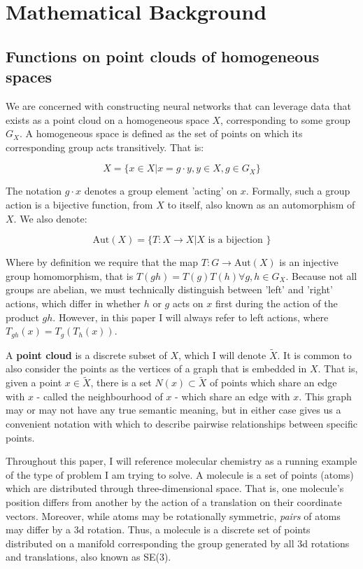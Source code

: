 \documentclass[11pt]{article}
\begin{document}
\section{Mathematical Background}
\subsection*{Functions on point clouds of homogeneous spaces}

We are concerned with constructing neural networks that can leverage data that exists as a point cloud on a homogeneous space $X$, corresponding to some group $G_X$. A homogeneous space is defined as the set of points on which its corresponding group acts transitively. That is: 

$$ X = \{x \in X | x = g \cdot y, y \in X, g \in G_X \} $$

The notation $g \cdot x$ denotes a group element 'acting' on $x$. Formally, such a group action is a bijective function, from $X$ to itself, also known as an automorphism of $X$. We also denote:

$$ \text{Aut}(X) = \{T: X \rightarrow X | X \text{ is a bijection } \}$$

Where by definition we require that the map $T: G \rightarrow \text{Aut}(X)$ is an injective group homomorphism, that is $T(gh)=T(g)T(h) \forall g, h \in G_X$. Because not all groups are abelian, we must technically distinguish between 'left' and 'right' actions, which differ in whether $h$ or $g$ acts on $x$ first during the action of the product $gh$. However, in this paper I will always refer to left actions, where $T_{gh} (x) = T_g (T_h (x))$.

A \textbf{point cloud} is a discrete subset of $X$, which I will denote $\tilde{X}$. It is common to also consider the points as the vertices of a graph that is embedded in $X$. That is, given a point $x \in  \tilde{X}$, there is a set $N(x) \subset \tilde{X}$ of points which share an edge with $x$ - called the neighbourhood of $x$ - which share an edge with $x$. This graph may or may not have any true semantic meaning, but in either case gives us a convenient notation with which to describe pairwise relationships between specific points.

Throughout this paper, I will reference molecular chemistry as a running example of the type of problem I am trying to solve. A molecule is a set of points (atoms) which are distributed through three-dimensional space. That is, one molecule's position differs from another by the action of a translation on their coordinate vectors. Moreover, while atoms may be rotationally symmetric, \textit{pairs} of atoms may differ by a 3d rotation. Thus, a molecule is a discrete set of points distributed on a manifold corresponding the group generated by all 3d rotations and translations, also known as SE(3).   
\end{document}

